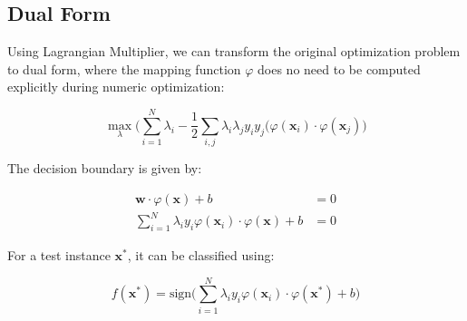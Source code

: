 \begin{multicols*}{2}
\section{Dual Form}

\noindent Using Lagrangian Multiplier, we can transform the original optimization problem to dual form, where the mapping function $\varphi$ does no need to be computed explicitly during numeric optimization:

$$\!\max_{\lambda} \Big( \sum_{i=1}^N \lambda_i - \frac{1}{2} \sum_{i,j} \lambda_i \lambda_j y_i y_j (\varphi(\mathbf{x}_i) \cdot \varphi(\mathbf{x}_j)  \Big)$$

\noindent The decision boundary is given by:

\begin{equation*}
\begin{split}
    \mathbf{w} \cdot \varphi(\mathbf{x}) + b &= 0\\
    \sum_{i=1}^N \lambda_i y_i \varphi(\mathbf{x}_i) \cdot \varphi(\mathbf{x}) + b &= 0
\end{split}
\end{equation*}

\noindent For a test instance $\mathbf{x}^*$, it can be classified using:

$$f(\mathbf{x}^*)= \text{sign} \Bigg( \sum_{i=1}^N \lambda_i y_i \varphi(\mathbf{x}_i) \cdot \varphi(\mathbf{x}^*) + b \Bigg)$$


\end{multicols*}
